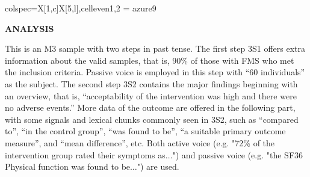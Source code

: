 \documentclass[a4paper]{ctexbook}
\begin{document}
\begin{sample}[label={myautocounter}]{\heiti}
{\begin{tblr}{colspec={X[1,c]X[5,l]},cell{even}{1,2} = {azure9}}
    \bottomrule
  \end{tblr}
  }

  \noindent \textbf{ANALYSIS}

  This is an M3 sample with two steps in past tense. The first step 3S1 offers extra information about the valid samples, that is, 90\% of those with FMS who met the inclusion criteria. Passive voice is employed in this step with ``60 individuals'' as the subject. The second step 3S2 contains the major findings beginning with an overview, that is, ``acceptability of the intervention was high and there were no adverse events.'' More data of the outcome are offered in the following part, with some signals and lexical chunks commonly seen in 3S2, such as ``compared to'', ``in the control group'', ``was found to be'', ``a suitable primary outcome measure'', and ``mean difference'', etc. Both active voice (e.g. "72\% of the intervention group rated their symptoms as$\dots$") and passive voice (e.g. "the SF36 Physical function was found to be$\dots$") are used.

\end{sample}
\end{document}

